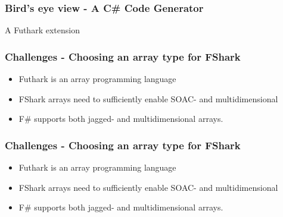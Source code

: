 \documentclass[10pt, compress, usenames, dvipsnames]{beamer}
\begin{document}
\begin{frame}[plain]
\frametitle{Bird's eye view - A C\# Code Generator}
\begin{center}
  \Huge A Futhark extension
\end{center}
\end{frame}

\begin{frame}[fragile]
  \frametitle{Challenges - Choosing an array type for FShark}
  \begin{itemize}
  \item <1-> Futhark is an array programming language
  \item <2-> FShark arrays need to sufficiently enable SOAC- and multidimensional
  \item <3-> F\# supports both jagged- and multidimensional arrays.
  \end{itemize}
\end{frame}
\begin{frame}[fragile]
  \frametitle{Challenges - Choosing an array type for FShark}
  \begin{itemize}
  \item <1-> Futhark is an array programming language
  \item <2-> FShark arrays need to sufficiently enable SOAC- and multidimensional
  \item <3-> F\# supports both jagged- and multidimensional arrays.
  \end{itemize}
\end{frame}
\end{document}
